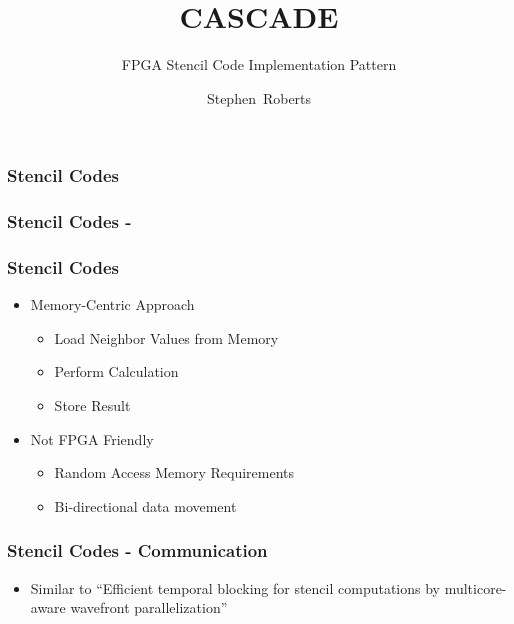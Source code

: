 \documentclass[draft]{beamer}
\title{CASCADE}
\subtitle{FPGA Stencil Code Implementation Pattern}
\author{Stephen~Roberts}
\institute{The University Of Warwick}
\begin{document}
  \frame{\titlepage}
  \begin{frame}
    \frametitle{Stencil Codes}
    \begin{figure}
      \centering
      
    \end{figure}
  \end{frame}

  \begin{frame}
    \frametitle{Stencil Codes - }
    \begin{figure}
      \centering
      
    \end{figure}
  \end{frame}

  \begin{frame}
    \frametitle{Stencil Codes}
    \begin{itemize}
      \item<1->{Memory-Centric Approach}
        \begin{itemize}
          \item{Load Neighbor Values from Memory}
          \item{Perform Calculation}
          \item{Store Result}
        \end{itemize}
      \item<2->{Not FPGA Friendly}
        \begin{itemize}
          \item{Random Access Memory Requirements}
          \item{Bi-directional data movement}
        \end{itemize}
    \end{itemize}
  \end{frame}













  \begin{frame}
    \frametitle{Stencil Codes - Communication}
    \begin{figure}
      \centering
      
    \end{figure}
  \end{frame}

  

  \begin{frame}
    \begin{itemize}
      \item{Similar to ``Efficient temporal blocking for stencil computations by multicore-aware wavefront
      parallelization''}
    \end{itemize}
  \end{frame}
\end{document}
